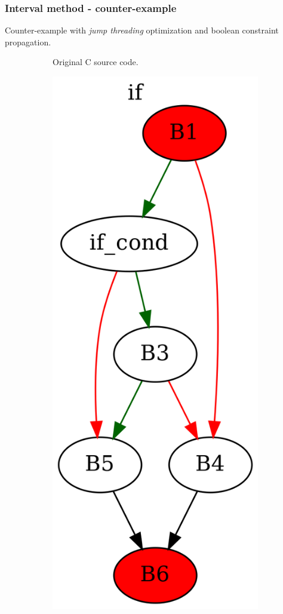 \documentclass[aspectratio=1610]{beamer}
\begin{document}
\begin{frame}[noframenumbering]
	\frametitle{Interval method - counter-example}
	Counter-example with \textit{jump threading} optimization and boolean constraint propagation.
	\begin{figure}[htbp]
		\centering
		\begin{subfigure}[b]{0.30\textwidth}
			\centering
			
			\caption{Original C source code.}
		\end{subfigure}
		\begin{subfigure}[b]{0.50\textwidth}
			\centering
			\includegraphics[height=0.5\paperheight]{inc/methods/interval/counter-example/bool_propagation_jump/f_0002a.png}

\end{subfigure}
\end{figure}
\end{frame}
\end{document}
